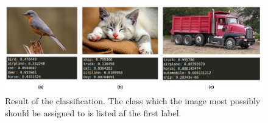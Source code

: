 \begin{figure}[H]
  \centering
  \includegraphics[width=\columnwidth]{Img/classification-images-with-labels.pdf}
  \caption{Result of the classification. The class which the image most possibly
  should be assigned to is listed af the first label.}
  \label{fig:images-result}
\end{figure}


